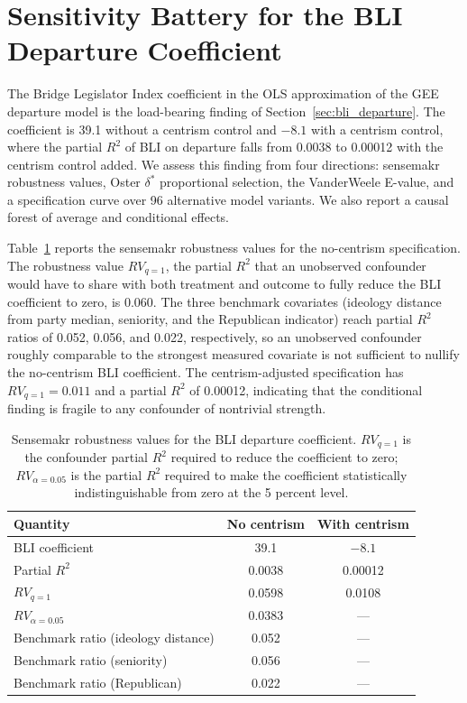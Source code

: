 \documentclass[12pt, a4paper]{article}
\begin{document}
\section{Sensitivity Battery for the BLI Departure Coefficient}
\label{app:sensitivity}

The Bridge Legislator Index coefficient in the OLS approximation of the GEE departure model is the load-bearing finding of Section~\ref{sec:bli_departure}. The coefficient is 39.1 without a centrism control and $-8.1$ with a centrism control, where the partial $R^2$ of BLI on departure falls from 0.0038 to 0.00012 with the centrism control added. We assess this finding from four directions: sensemakr robustness values, Oster $\delta^*$ proportional selection, the VanderWeele E-value, and a specification curve over 96 alternative model variants. We also report a causal forest of average and conditional effects.

Table~\ref{tab:sensemakr} reports the sensemakr robustness values for the no-centrism specification. The robustness value $RV_{q=1}$, the partial $R^2$ that an unobserved confounder would have to share with both treatment and outcome to fully reduce the BLI coefficient to zero, is 0.060. The three benchmark covariates (ideology distance from party median, seniority, and the Republican indicator) reach partial $R^2$ ratios of 0.052, 0.056, and 0.022, respectively, so an unobserved confounder roughly comparable to the strongest measured covariate is not sufficient to nullify the no-centrism BLI coefficient. The centrism-adjusted specification has $RV_{q=1} = 0.011$ and a partial $R^2$ of 0.00012, indicating that the conditional finding is fragile to any confounder of nontrivial strength.

\begin{table}[H]
\centering
\caption{Sensemakr robustness values for the BLI departure coefficient. $RV_{q=1}$ is the confounder partial $R^2$ required to reduce the coefficient to zero; $RV_{\alpha=0.05}$ is the partial $R^2$ required to make the coefficient statistically indistinguishable from zero at the 5 percent level.}
\label{tab:sensemakr}
\small
\begin{tabular}{lcc}
\toprule
Quantity & No centrism & With centrism \\
\midrule
BLI coefficient & 39.1 & $-8.1$ \\
Partial $R^2$ & 0.0038 & 0.00012 \\
$RV_{q=1}$ & 0.0598 & 0.0108 \\
$RV_{\alpha=0.05}$ & 0.0383 & --- \\
Benchmark ratio (ideology distance) & 0.052 & --- \\
Benchmark ratio (seniority) & 0.056 & --- \\
Benchmark ratio (Republican) & 0.022 & --- \\
\bottomrule
\end{tabular}
\end{table}
\end{document}

